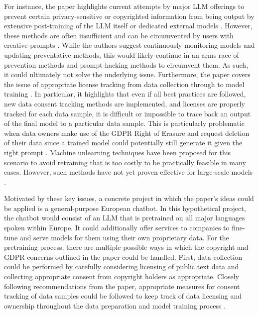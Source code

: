 \documentclass[11pt]{article}
\begin{document}
For instance, the paper highlights current attempts by major LLM offerings to prevent certain privacy-sensitive or copyrighted information from being output by extensive post-training of the LLM itself or dedicated external models \parencite{10556135}. However, these methods are often insufficient and can be circumvented by users with creative prompts \parencite{10556135}. While the authors suggest continuously monitoring models and updating preventative methods, this would likely continue in an arms race of prevention methods and prompt hacking methods to circumvent them. As such, it could ultimately not solve the underlying issue. Furthermore, the paper covers the issue of appropriate license tracking from data collection through to model training \parencite{10556135}. In particular, it highlights that even if all best practices are followed, new data consent tracking methods are implemented, and licenses are properly tracked for each data sample, it is difficult or impossible to trace back an output of the final model to a particular data sample. This is particularly problematic when data owners make use of the GDPR Right of Erasure and request deletion of their data since a trained model could potentially still generate it given the right prompt \parencite{10556135}. Machine unlearning techniques have been proposed for this scenario to avoid retraining that is too costly to be practically feasible in many cases. However, such methods have not yet proven effective for large-scale models \parencite{10556135}. 

Motivated by these key issues, a concrete project in which the paper's ideas could be applied is a general-purpose European chatbot. In this hypothetical project, the chatbot would consist of an LLM that is pretrained on all major languages spoken within Europe. It could additionally offer services to companies to fine-tune and serve models for them using their own proprietary data.
For the pretraining process, there are multiple possible ways in which the copyright and GDPR concerns outlined in the paper could be handled. First, data collection could be performed by carefully considering licensing of public text data and collecting appropriate consent from copyright holders as appropriate. Closely following recommendations from the paper, appropriate measures for consent tracking of data samples could be followed to keep track of data licensing and ownership throughout the data preparation and model training process \parencite{10556135}. 
\end{document}

